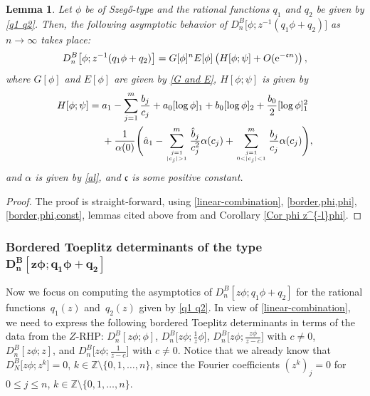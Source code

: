\documentclass[10pt,a4paper]{amsart}
\numberwithin{equation}{section}
\newtheorem{Lemma}[Theorem]{Lemma}
 { \theoremstyle{definition}
\newtheorem{Definition}[Theorem]{Definition}
\newtheorem{Example}[Theorem]{Example}
\newtheorem{Remark}[Theorem]{Remark}
\newtheorem{Question}[Theorem]{Question}
}
\newcommand{\Z}{{\mathbb Z}}
\newcommand{\al}{\alpha}
\newcommand{\di}{\displaystyle}
\begin{document}
	\begin{Lemma}\label{main lem 1}
		Let $\phi$ be of Szeg\H{o}-type and the rational functions $q_1$ and $q_2$ be given by \eqref{q1 q2}. Then, the following asymptotic behavior of $D^B_{n}\big[\phi;z^{-1}(q_1\phi+q_2)\big]$ as $n \to \infty$ takes place:
		\begin{gather*}%
				D^B_{n}\big[\phi;z^{-1}(q_1\phi+q_2)\big] =
				G[\phi]^{n} E[\phi]\left(H[\phi;\psi] + O({\rm e}^{-\mathfrak{c}n})\right),
			\end{gather*}
			where $G[\phi]$ and $E[\phi]$ are given by \eqref{G and E}, $H[\phi;\psi]$ is given by
			\begin{align}
					H[\phi;\psi] ={}&	
					a_1 - \sum_{j=1}^{m} \frac{b_j}{c_j}+ a_0 [\log \phi]_{1}+ b_0 [\log \phi]_{2} + \frac{b_0}{2} [\log \phi]_{1}^2\nonumber
					\\ & +
					\frac{1}{\al(0)}\Bigg(
					\hat{a}_1-
					 \sum^{m}_{j=1 \atop |c_j|>1 }\frac{\hat{b}_j}{c^2_j} \al(c_j) + 		\sum^m_{j=1 \atop 0<|c_j|<1} \frac{b_j}{c_j} \al(c_j) \Bigg), \label{ConstantH}
			\end{align}
			and	$\al$ is given by \eqref{al}, and $\mathfrak{c}$ is some positive constant.
		\end{Lemma}
		\begin{proof}
			The proof is straight-forward, using \eqref{linear-combination}, \eqref{border,phi,phi}, \eqref{border,phi,const}, lemmas cited above from \cite{BEGIL} and Corollary \ref{Cor phi z^{-l}phi}.
		\end{proof}
		
\subsubsection[Bordered Toeplitz determinants of the type \protect{$D^B_{n}[z\phi;q_1\phi+q_2]$}]{Bordered Toeplitz determinants of the type $\boldsymbol{D^B_{n}[z\phi;q_1\phi+q_2]}$}

		Now we focus on computing the asymptotics of $ D^B_{n}[z\phi;q_1\phi+q_2] $ for the rational functions~$q_1(z)$ and~$q_2(z)$ given by \eqref{q1 q2}. In view of \eqref{linear-combination}, we need to express the following bordered Toeplitz determinants in terms of the data from the $Z$-RHP: $D^B_{n}[z\phi;\phi]$,
		$D^B_{n}\big[z\phi;\di \tfrac{1}{z}\phi\big]$,
		$D^B_{n}\big[z\phi;\di \tfrac{z\phi}{z-c}\big]$ with ${c \neq 0}$,
		$D^B_{n}[z\phi;z]$, and
		$D^B_{n}\big[z\phi;\di \tfrac{1}{z-c}\big]$ with $c \neq 0$.	Notice that we already know that $D^B_{N}\big[z\phi;z^k\big]=0$, $k \in \Z \setminus \{0,1,\dots,n\}$, since the Fourier coefficients $(z^k)_j=0$ for $0\leq j \leq n$, $k \in \Z \setminus \{0,1,\dots,n\}$.
		
\end{document}
